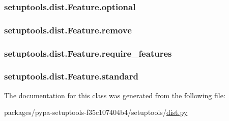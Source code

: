 \subsubsection[{optional}]{\setlength{\rightskip}{0pt plus 5cm}setuptools.\+dist.\+Feature.\+optional}\label{classsetuptools_1_1dist_1_1Feature_a52f214040c829332ca5420e1cbe4ed3a}
\hypertarget{classsetuptools_1_1dist_1_1Feature_a8d9c70cbfbf09b131734ce64698ae734}{}
\subsubsection[{remove}]{\setlength{\rightskip}{0pt plus 5cm}setuptools.\+dist.\+Feature.\+remove}\label{classsetuptools_1_1dist_1_1Feature_a8d9c70cbfbf09b131734ce64698ae734}
\hypertarget{classsetuptools_1_1dist_1_1Feature_ada7c401027d0f0d6f828a2ffed58b6c3}{}
\subsubsection[{require\+\_\+features}]{\setlength{\rightskip}{0pt plus 5cm}setuptools.\+dist.\+Feature.\+require\+\_\+features}\label{classsetuptools_1_1dist_1_1Feature_ada7c401027d0f0d6f828a2ffed58b6c3}
\hypertarget{classsetuptools_1_1dist_1_1Feature_a6bed2f1c5dd9deb63f88fa5dbc65d3cf}{}
\subsubsection[{standard}]{\setlength{\rightskip}{0pt plus 5cm}setuptools.\+dist.\+Feature.\+standard}\label{classsetuptools_1_1dist_1_1Feature_a6bed2f1c5dd9deb63f88fa5dbc65d3cf}


The documentation for this class was generated from the following file\+:\begin{DoxyCompactItemize}
\item 
packages/pypa-\/setuptools-\/f35c107404b4/setuptools/\hyperlink{dist_8py}{dist.\+py}\end{DoxyCompactItemize}
